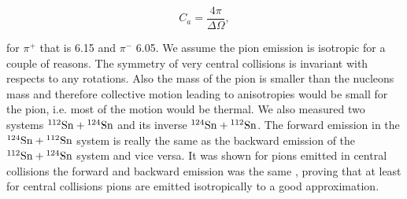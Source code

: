 \begin{equation}
C_a = \frac{4\pi}{\Delta\Omega},
\end{equation}

for $\pi^+$ that is \num{6.15} and $\pi^-$ \num{6.05}. We assume the pion emission is isotropic for a couple of reasons. The symmetry of very central collisions is invariant with respects to any rotations. Also the mass of the pion is smaller than the nucleons mass and therefore collective motion leading to anisotropies would be small for the pion, i.e. most of the motion would be thermal. We also measured two systems ${}^{112}\mathrm{Sn} + {}^{124}\mathrm{Sn}$ and its inverse ${}^{124}\mathrm{Sn} + {}^{112}\mathrm{Sn}$. The forward emission in the ${}^{124}\mathrm{Sn} + {}^{112}\mathrm{Sn}$ system is really the same as the backward emission of the ${}^{112}\mathrm{Sn} + {}^{124}\mathrm{Sn}$ system and vice versa. It was shown for pions emitted in central collisions the forward and backward emission was the same \cite{jon}, proving that at least for central collisions pions are emitted isotropically to a good approximation. 


